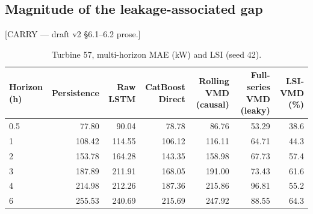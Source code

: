 \documentclass[review,3p,times]{elsarticle}
\newcommand{\carry}[1]{\textsf{\small [CARRY --- #1]}}
\begin{document}
\subsection{Magnitude of the leakage-associated gap}\label{sec:magnitude}
\carry{draft v2 §6.1--6.2 prose.}

\begin{table}[htbp]\centering
\caption{Turbine 57, multi-horizon MAE (kW) and LSI (seed 42).}
\label{tab:horizon}
\footnotesize
\begin{tabular}{lrrrrrr}
\toprule
Horizon (h) & Persistence & Raw LSTM & CatBoost Direct &
Rolling VMD (causal) & Full-series VMD (leaky) & LSI-VMD (\%) \\
\midrule
0.5 &  77.80 &  90.04 &  78.78 &  86.76 & 53.29 & 38.6 \\
1   & 108.42 & 114.55 & 106.12 & 116.11 & 64.71 & 44.3 \\
2   & 153.78 & 164.28 & 143.35 & 158.98 & 67.73 & 57.4 \\
3   & 187.89 & 211.91 & 168.05 & 191.00 & 73.43 & 61.6 \\
4   & 214.98 & 212.26 & 187.36 & 215.86 & 96.81 & 55.2 \\
6   & 255.53 & 240.69 & 215.69 & 247.92 & 88.55 & 64.3 \\
\bottomrule
\end{tabular}
\end{table}
\end{document}
